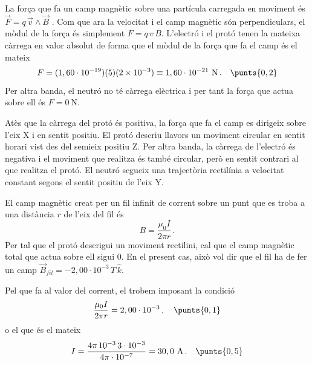 \begin{solapartat}
La força que fa un camp magnètic sobre una partícula carregada en moviment és $\vec{F} = q\,\vec{v}\wedge\vec{B}$ \unskip. Com que ara la velocitat i el camp magnètic són perpendiculars, el mòdul de la força és simplement $F = q\,v\,B$.  L'electró i el protó tenen la mateixa càrrega en valor absolut de forma que el mòdul de la força que fa el camp és el mateix
\[ F = (1,60\cdot 10^{-19})(5)(2\times 10^{-3}) \equiv 1,60\cdot 10^{-21}\ \mathrm{N}\,. \quad\punts{0,2} \]
Per altra banda, el neutró no té càrrega elèctrica i per tant la força que actua sobre ell és $F = 0\ \mathrm{N}$. 

Atès que la càrrega del protó és positiva, la força que fa el camp es dirigeix sobre l'eix X i en sentit positiu.  El protó descriu llavors un moviment circular en sentit horari vist des del semieix positiu Z.  Per altra banda, la càrrega de l'electró és negativa i el moviment que realitza és també circular, però en sentit contrari al que realitza el protó.  El neutró segueix una trajectòria rectilínia a velocitat constant segons el sentit positiu de l'eix Y. 
\end{solapartat}

\begin{solapartat}
El camp magnètic creat per un fil infinit de corrent sobre un punt que es troba a una distància $r$ de l'eix del fil és
\[ B = \frac{\mu_0 I}{2\pi r}\,. \]
Per tal que el protó descrigui un moviment rectilini, cal que el camp magnètic total que actua sobre ell sigui 0. En el present cas, això vol dir que el fil ha de fer un camp $\vec{B}_{fil} = -2,00\cdot 10^{-3}\,T\,\hat{k}$. 

Pel que fa al valor del corrent, el trobem imposant la condició
\[ \frac{\mu_0 I}{2\pi r} = 2,00\cdot 10^{-3}\,, \quad\punts{0,1} \]
o el que és el mateix
\[ I = \frac{4\pi\, 10^{-3}\, 3\cdot 10^{-3}}{4\pi\cdot 10^{-7}} = 30,0\ \mathrm{A}\,. \quad\punts{0,5} \]
\end{solapartat}
